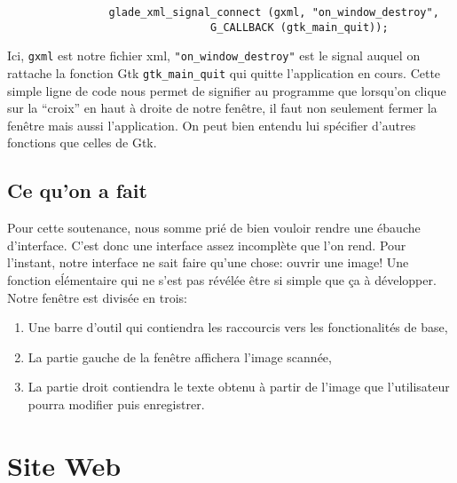 \documentclass[]{report}
\begin{document}
			\begin{verbatim}
				glade_xml_signal_connect (gxml, "on_window_destroy",
							    G_CALLBACK (gtk_main_quit));
			\end{verbatim}

			Ici, \verb!gxml! est notre fichier xml, \verb!"on_window_destroy"! est le signal auquel on rattache la fonction Gtk \verb!gtk_main_quit! qui quitte l'application en cours. Cette simple ligne de code nous permet de signifier au programme que lorsqu'on clique sur la ``croix'' en haut \`a droite de notre fen\^etre, il faut non seulement fermer la fen\^etre mais aussi l'application.
			On peut bien entendu lui sp\'ecifier d'autres fonctions que celles de Gtk.


		\section{Ce qu'on a fait} %
		\label{sec:ce_qu_on_a_fait}
			Pour cette soutenance, nous somme pri\'e de bien vouloir rendre une \'ebauche d'interface. C'est donc une interface assez incompl\`ete que l'on rend. Pour l'instant, notre interface ne sait faire qu'une chose: ouvrir une image! Une fonction e\'l\'ementaire qui ne s'est pas r\'ev\'el\'ee \^etre si simple que \c ca \`a d\'evelopper. Notre fen\^etre est divis\'ee en trois:
			\begin{enumerate}
				\item Une barre d'outil qui contiendra les raccourcis vers les fonctionalit\'es de base,
				\item La partie gauche de la fen\^etre affichera l'image scann\'ee,
				\item La partie droit contiendra le texte obtenu \`a partir de l'image que l'utilisateur pourra modifier puis enregistrer.
			\end{enumerate}
			
			
		
		
		

	\chapter{Site Web} %
	\label{cha:site_web}
\end{document}
